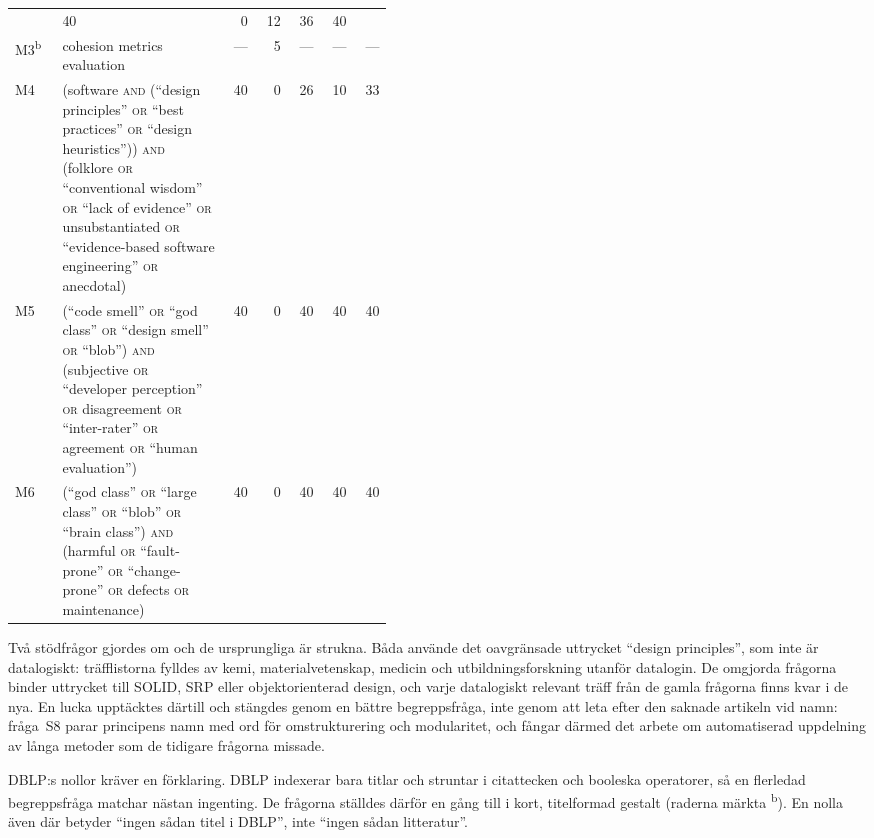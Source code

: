 \begin{table}[htbp]
\begin{sidecaption}
\begin{tabular}{@{}lp{0.44\linewidth}rrrrr@{}}
         & 40 & 0 & 12 & 36 & 40 \\
      M3\textsuperscript{b} & cohesion metrics evaluation
         & --- & 5 & --- & --- & --- \\
      M4 & (software \textsc{and} (\enquote{design principles} \textsc{or} \enquote{best practices} \textsc{or} \enquote{design heuristics})) \textsc{and} (folklore \textsc{or} \enquote{conventional wisdom} \textsc{or} \enquote{lack of evidence} \textsc{or} unsubstantiated \textsc{or} \enquote{evidence-based software engineering} \textsc{or} anecdotal)
         & 40 & 0 & 26 & 10 & 33 \\
      M5 & (\enquote{code smell} \textsc{or} \enquote{god class} \textsc{or} \enquote{design smell} \textsc{or} \enquote{blob}) \textsc{and} (subjective \textsc{or} \enquote{developer perception} \textsc{or} disagreement \textsc{or} \enquote{inter-rater} \textsc{or} agreement \textsc{or} \enquote{human evaluation})
         & 40 & 0 & 40 & 40 & 40 \\
      M6 & (\enquote{god class} \textsc{or} \enquote{large class} \textsc{or} \enquote{blob} \textsc{or} \enquote{brain class}) \textsc{and} (harmful \textsc{or} \enquote{fault-prone} \textsc{or} \enquote{change-prone} \textsc{or} defects \textsc{or} maintenance)
         & 40 & 0 & 40 & 40 & 40 \\
      \bottomrule
    \end{tabular}
  \end{sidecaption}
\end{table}

Två stödfrågor gjordes om och de ursprungliga är strukna.  Båda använde
det oavgränsade uttrycket \enquote{design principles}, som inte är
datalogiskt: träfflistorna fylldes av kemi, materialvetenskap, medicin
och utbildningsforskning utanför datalogin.  De omgjorda frågorna binder
uttrycket till SOLID, SRP eller objektorienterad design, och varje
datalogiskt relevant träff från de gamla frågorna finns kvar i de nya.
En lucka upptäcktes därtill och stängdes genom en bättre begreppsfråga,
inte genom att leta efter den saknade artikeln vid namn: fråga~S8 parar
principens namn med ord för omstrukturering och modularitet, och fångar
därmed det arbete om automatiserad uppdelning av långa metoder som de
tidigare frågorna missade.

DBLP:s nollor kräver en förklaring.  DBLP indexerar bara titlar och
struntar i citattecken och booleska operatorer, så en flerledad
begreppsfråga matchar nästan ingenting.  De frågorna ställdes därför en
gång till i kort, titelformad gestalt (raderna märkta \textsuperscript{b}).
En nolla även där betyder \enquote{ingen sådan titel i DBLP}, inte
\enquote{ingen sådan litteratur}.


